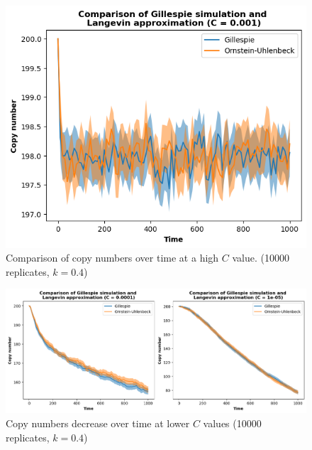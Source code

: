 \documentclass[]{article}
\begin{document}
\begin{figure} [h] 
	\centering %
	\includegraphics[scale=0.6]{figs/langevin_match_1} %
	\caption{Comparison of copy numbers over time at a high $C$ value. (10000 replicates, $k = 0.4$)} 
	\label{fig:match_1}
\end{figure}

\begin{figure} [h] 
	\centering %
	\includegraphics[scale=0.6]{figs/langevin_match_2} 
	\caption{Copy numbers decrease over time at lower $C$ values (10000 replicates, $k = 0.4$)} 
	\label{fig:match_2}
\end{figure}
\end{document}
